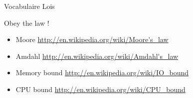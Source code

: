 \begin{Frame}{Vocabulaire Lois}
  \begin{block}{Obey the law !}
  \begin{itemize}
  \item Moore \url{http://en.wikipedia.org/wiki/Moore's_law}
  \item Amdahl \url{http://en.wikipedia.org/wiki/Amdahl's_law}
  \item Memory bound \url{http://en.wikipedia.org/wiki/IO_bound}
  \item CPU bound \url{http://en.wikipedia.org/wiki/CPU_bound}
  \end{itemize}
    
  \end{block}
\end{Frame}


